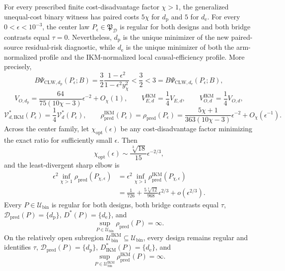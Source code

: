 For every prescribed finite cost-disadvantage factor \(\chi>1\), the generalized unequal-cost binary witness has paired costs \(5\chi\) for \(d_{\mathrm p}\) and \(5\) for \(d_{\mathrm e}\). For every \(0<\epsilon<10^{-3}\), the center law \(P_\epsilon\in\mathfrak P_{\mathcal D}\) is regular for both designs and both bridge contrasts equal \(\tau=0\). Nevertheless, \(d_{\mathrm p}\) is the unique minimizer of the new paired-source residual-risk diagnostic, while \(d_{\mathrm e}\) is the unique minimizer of both the arm-normalized profile and the IKM-normalized local causal-efficiency profile. More precisely,
\[
 B\Psi_{\mathrm{CLW},d_{\mathrm p}}(P_\epsilon;B)
 =\frac32\frac{1-\epsilon^2}{1-\epsilon^2y_\chi^2}
 <\frac32<3
 =B\Psi_{\mathrm{CLW},d_{\mathrm e}}(P_\epsilon;B),
\]
\[
 V_{O,d_{\mathrm p}}
 =\frac{64}{75(10\chi-3)}\epsilon^{-2}+O_\chi(1),
 \qquad
 V_{E,d}^{\mathrm{IKM}}=\frac14V_{E,d},
 \qquad
 V_{O,d}^{\mathrm{IKM}}=\frac14V_{O,d},
\]
\[
 \mathcal V_{d,\mathrm{IKM}}^*(P_\epsilon)
 =\frac14\mathcal V_d^*(P_\epsilon),
 \qquad
 \rho_{\mathrm{pred}}^{\mathrm{IKM}}(P_\epsilon)
 =\rho_{\mathrm{pred}}(P_\epsilon)
 =\frac{5\chi+1}{363(10\chi-3)}\epsilon^{-2}
 +O_\chi(\epsilon^{-1}).
\]
Across the center family, let \(\chi_{\mathrm{opt}}(\epsilon)\) be any cost-disadvantage factor minimizing the exact ratio for sufficiently small \(\epsilon\). Then
\[
 \chi_{\mathrm{opt}}(\epsilon)
 \sim \frac{\sqrt[3]{18}}{15}\epsilon^{-2/3},
\]
and the least-divergent sharp elbow is
\[
\begin{aligned}
 \epsilon^2\inf_{\chi>1}\rho_{\mathrm{pred}}(P_{\chi,\epsilon})
 &=\epsilon^2\inf_{\chi>1}\rho_{\mathrm{pred}}^{\mathrm{IKM}}(P_{\chi,\epsilon})\\
 &=\frac1{726}+\frac{5\sqrt[3]{12}}{968}\epsilon^{2/3}
 +o(\epsilon^{2/3}).
\end{aligned}
\]
Every \(P\in\mathcal U_{\mathrm{bin}}\) is regular for both designs, both bridge contrasts equal \(\tau\), \(\mathcal D_{\mathrm{pred}}(P)=\{d_{\mathrm p}\}\), \(D^*(P)=\{d_{\mathrm e}\}\), and
\[
 \sup_{P\in\mathcal U_{\mathrm{bin}}}\rho_{\mathrm{pred}}(P)=\infty.
\]
On the relatively open subregion \(\mathcal U_{\mathrm{bin}}^{\mathrm{IKM}}\subseteq\mathcal U_{\mathrm{bin}}\), every design remains regular and identifies \(\tau\), \(\mathcal D_{\mathrm{pred}}(P)=\{d_{\mathrm p}\}\), \(D_{\mathrm{IKM}}^*(P)=\{d_{\mathrm e}\}\), and
\[
 \sup_{P\in\mathcal U_{\mathrm{bin}}^{\mathrm{IKM}}}
 \rho_{\mathrm{pred}}^{\mathrm{IKM}}(P)=\infty.
\]
